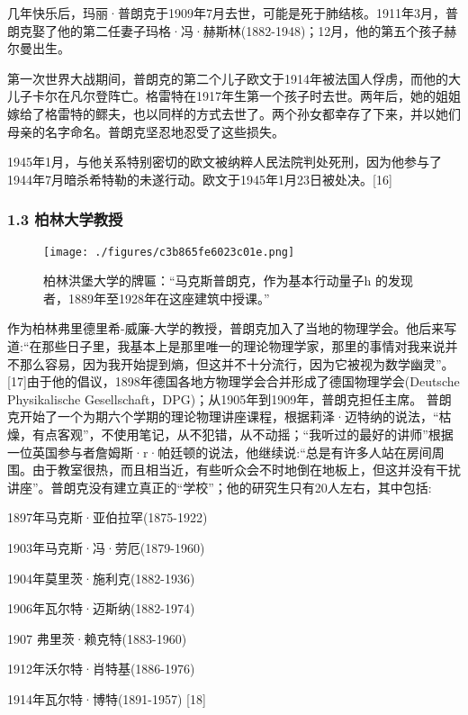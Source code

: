 几年快乐后，玛丽·普朗克于1909年7月去世，可能是死于肺结核。1911年3月，普朗克娶了他的第二任妻子玛格·冯·赫斯林(1882-1948)；12月，他的第五个孩子赫尔曼出生。

第一次世界大战期间，普朗克的第二个儿子欧文于1914年被法国人俘虏，而他的大儿子卡尔在凡尔登阵亡。格雷特在1917年生第一个孩子时去世。两年后，她的姐姐嫁给了格雷特的鳏夫，也以同样的方式去世了。两个孙女都幸存了下来，并以她们母亲的名字命名。普朗克坚忍地忍受了这些损失。

1945年1月，与他关系特别密切的欧文被纳粹人民法院判处死刑，因为他参与了1944年7月暗杀希特勒的未遂行动。欧文于1945年1月23日被处决。[16]

\subsubsection{1.3 柏林大学教授}
\begin{figure}[ht]
\centering
\texttt{[image: ./figures/c3b865fe6023c01e.png]}
\caption{柏林洪堡大学的牌匾：“马克斯普朗克，作为基本行动量子h 的发现者，1889年至1928年在这座建筑中授课。”} \label{fig_Max_3}
\end{figure}
作为柏林弗里德里希-威廉-大学的教授，普朗克加入了当地的物理学会。他后来写道:“在那些日子里，我基本上是那里唯一的理论物理学家，那里的事情对我来说并不那么容易，因为我开始提到熵，但这并不十分流行，因为它被视为数学幽灵”。[17]由于他的倡议，1898年德国各地方物理学会合并形成了德国物理学会(Deutsche Physikalische Gesellschaft，DPG)；从1905年到1909年，普朗克担任主席。
普朗克开始了一个为期六个学期的理论物理讲座课程，根据莉泽·迈特纳的说法，“枯燥，有点客观”，不使用笔记，从不犯错，从不动摇；“我听过的最好的讲师”根据一位英国参与者詹姆斯·r·帕廷顿的说法，他继续说:“总是有许多人站在房间周围。由于教室很热，而且相当近，有些听众会不时地倒在地板上，但这并没有干扰讲座”。普朗克没有建立真正的“学校”；他的研究生只有20人左右，其中包括:

1897年马克斯·亚伯拉罕(1875-1922)

1903年马克斯·冯·劳厄(1879-1960)

1904年莫里茨·施利克(1882-1936)

1906年瓦尔特·迈斯纳(1882-1974)

1907 弗里茨·赖克特(1883-1960)

1912年沃尔特·肖特基(1886-1976)

1914年瓦尔特·博特(1891-1957)  [18]